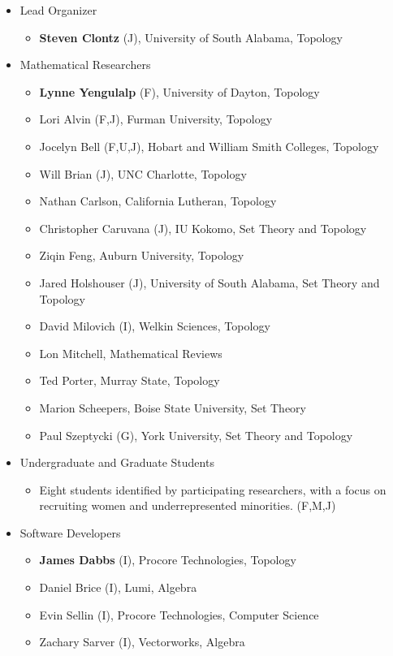 \documentclass{amsart}
\newcommand{\TODO}[1]{\textcolor{red}{(TODO: #1)}}
\begin{document}
\begin{itemize}
    \item Lead Organizer
    \begin{itemize}
        \item \textbf{Steven Clontz} (J), University of South Alabama, Topology
    \end{itemize}
    \item Mathematical Researchers
    \begin{itemize}
        \item \textbf{Lynne Yengulalp} (F), University of Dayton, Topology
        \item Lori Alvin (F,J), Furman University, Topology
        \item Jocelyn Bell (F,U,J), Hobart and William Smith Colleges, Topology
        \item Will Brian (J), UNC Charlotte, Topology
        \item Nathan Carlson, California Lutheran, Topology
        \item Christopher Caruvana (J), IU Kokomo, Set Theory and Topology
        \item Ziqin Feng, Auburn University, Topology
        \item Jared Holshouser (J), University of South Alabama, Set Theory and Topology
        \item David Milovich (I), Welkin Sciences, Topology
        \item Lon Mitchell, Mathematical Reviews
        \item Ted Porter, Murray State, Topology
        \item Marion Scheepers, Boise State University, Set Theory
        \item Paul Szeptycki (G), York University, Set Theory and Topology
    \end{itemize}
    \item Undergraduate and Graduate Students
    \begin{itemize}
        \item Eight students identified by participating researchers, with a
          focus on recruiting women and underrepresented minorities. (F,M,J)
    \end{itemize}
    \item Software Developers 
    \begin{itemize}
        \item \textbf{James Dabbs} (I), Procore Technologies, Topology
        \item Daniel Brice (I), Lumi, Algebra
        \item Evin Sellin (I), Procore Technologies, Computer Science
        \item Zachary Sarver (I), Vectorworks, Algebra
    \end{itemize}
\end{itemize}

{}

\end{document}
